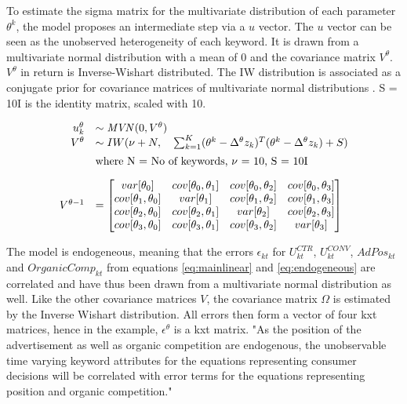 To estimate the sigma matrix for the multivariate distribution of each parameter $\theta^k$, the model proposes an intermediate step via a $u$ vector.
The $u$ vector can be seen as the unobserved heterogeneity of each keyword. It is drawn from a multivariate normal distribution with a mean of 0 and the covariance matrix $V^\theta$. $V^{\theta}$ in return is Inverse-Wishart distributed. The IW distribution is associated as a conjugate prior for covariance matrices of multivariate normal distributions \citep[p. 28ff.]{rossibook}. S = 10I is the identity matrix, scaled with 10.

\begin{equation}
    \begin{array}{rl} \label{eq:vmatrix}
         u^{\theta}_k &\sim \text{\textit{MVN}}(0, V^{\theta}) \\
         V^{\theta} &\sim IW(\nu + N, \quad \sum\nolimits^K_{k=1} (\theta^k - \Delta^{\theta} z_k)^T(\theta^k - \Delta^{\theta} z_k) + S)\\[5pt]
         &\text{where N = No of keywords, $\nu$ = 10, S = 10I}\\[10pt]
         V^{\theta-1} &= \begin{bmatrix}
         var[\theta_0] & cov[\theta_0, \theta_1]& cov[\theta_0, \theta_2]& cov[\theta_0, \theta_3]\\
         cov[\theta_1, \theta_0] & var[\theta_1]& cov[\theta_1, \theta_2]& cov[\theta_1, \theta_3]\\
         cov[\theta_2, \theta_0] & cov[\theta_2, \theta_1]& var[\theta_2]& cov[\theta_2, \theta_3]\\
         cov[\theta_3, \theta_0] & cov[\theta_3, \theta_1]& cov[\theta_3, \theta_2] & var[\theta_3]
         \end{bmatrix}
    \end{array}
\end{equation}

The model is endogeneous, meaning that the errors $\epsilon_{kt}$ for $U^{CTR}_{kt}$, $U^{CONV}_{kt}$, $AdPos_{kt}$ and $OrganicComp_{kt}$ from equations \ref{eq:mainlinear} and \ref{eq:endogeneous} are correlated and have thus been drawn from a multivariate normal distribution as well. Like the other covariance matrices $V$, the covariance matrix $\Omega$ is estimated by the Inverse Wishart distribution. All errors then form a vector of four kxt matrices, hence in the example, $\epsilon^{\theta}$ is a kxt matrix. "As the position of the advertisement as well as organic competition are endogenous, the
unobservable time varying keyword attributes for the equations representing consumer decisions will be correlated with error terms for the equations representing position and organic competition."\citep[p. 26]{agarwal_organic_2015}

